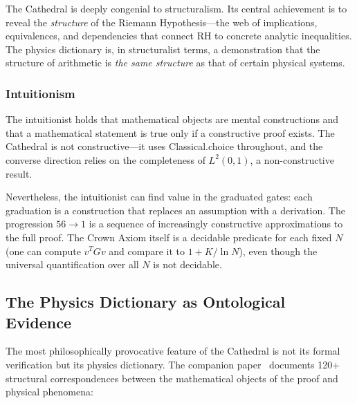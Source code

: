 The Cathedral is deeply congenial to structuralism. Its central
achievement is to reveal the \emph{structure} of the Riemann
Hypothesis---the web of implications, equivalences, and
dependencies that connect RH to concrete analytic inequalities.
The physics dictionary is, in structuralist terms, a demonstration
that the structure of arithmetic is \emph{the same structure}
as that of certain physical systems.

\subsubsection{Intuitionism}

The intuitionist holds that mathematical objects are mental
constructions and that a mathematical statement is true only if a
constructive proof exists. The Cathedral is not constructive---it
uses Classical.choice throughout, and the converse direction relies
on the completeness of $L^2(0,1)$, a non-constructive result.

Nevertheless, the intuitionist can find value in the graduated
gates: each graduation is a construction that replaces an
assumption with a derivation. The progression $56 \to 1$ is a
sequence of increasingly constructive approximations to the full
proof. The Crown Axiom itself is a decidable predicate for each
fixed $N$ (one can compute $v^TGv$ and compare it to
$1 + K/\ln N$), even though the universal quantification over
all $N$ is not decidable.

\subsection{The Physics Dictionary as Ontological Evidence}

The most philosophically provocative feature of the Cathedral is
not its formal verification but its physics dictionary. The
companion paper~\cite{cathedral-physics} documents 120+ structural
correspondences between the mathematical objects of the proof and
physical phenomena:

